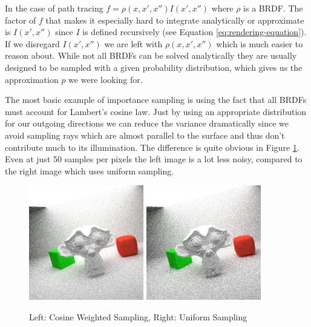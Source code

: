 \documentclass{ACGSeminar}
\begin{document}
In the case of path tracing $f = \rho(x,x',x'')I(x',x'')$ where $\rho$ is a BRDF. The factor of $f$ that makes it especially hard to integrate analytically or approximate is $I(x',x'')$ since $I$ is defined recursively (see Equation \eqref{eq:rendering-equation}). If we disregard $I(x',x'')$ we are left with $\rho(x,x',x'')$ which is much easier to reason about. While not all BRDFs can be solved analytically \cite{Montes2012} they are usually designed to be sampled with a given probability distribution, which gives us the approximation $p$ we were looking for. 


The most basic example of importance sampling is using the fact that all BRDFs must account for Lambert's cosine law. Just by using an appropriate distribution for our outgoing directions we can reduce the variance dramatically since we avoid sampling rays which are almost parallel to the surface and thus don't contribute much to its illumination. The difference is quite obvious in Figure \ref{fig:rendering-cos-weighted}. Even at just 50 samples per pixels the left image is a lot less noisy, compared to the right image which uses uniform sampling.

\begin{figure}[htb!]
  \centering
  \includegraphics[width=5cm,natwidth=512,natheight=512]{figures/50_spp_cosine_weighted.png}
  \includegraphics[width=5cm,natwidth=512,natheight=512]{figures/50_spp_uniform.png}
  \caption{Left: Cosine Weighted Sampling, Right: Uniform Sampling}
  \label{fig:rendering-cos-weighted}
\end{figure}
\end{document}

